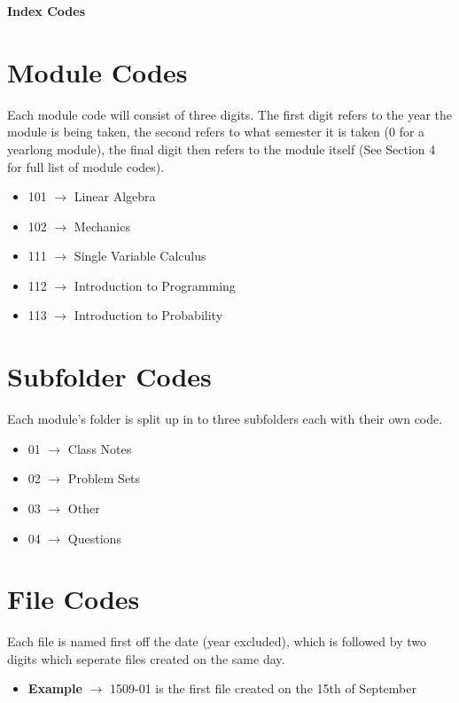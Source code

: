 \documentclass{article}
\begin{document}
\begin{center}
    \Huge \textbf{Index Codes}
\end{center}
\vspace{5mm}
\section{\textbf{Module Codes}}
Each module code will consist of three digits. The first digit refers to the year the module is being taken, 
the second refers to what semester it is taken (0 for a yearlong module), the final digit then refers to 
the module itself (See Section 4 for full list of module codes).
\begin{itemize}
    \item 101 $\longrightarrow$ Linear Algebra
    \item 102 $\longrightarrow$ Mechanics
    \item 111 $\longrightarrow$ Single Variable Calculus
    \item 112 $\longrightarrow$ Introduction to Programming
    \item 113 $\longrightarrow$ Introduction to Probability
\end{itemize}
\vspace{2.5mm}
\section{\textbf{Subfolder Codes}}
Each module's folder is split up in to three subfolders each with their own code. 
\begin{itemize}
    \item 01 $\longrightarrow$ Class Notes
    \item 02 $\longrightarrow$ Problem Sets
    \item 03 $\longrightarrow$ Other
    \item 04 $\longrightarrow$ Questions
\end{itemize}
\vspace{2.5mm}
\section{\textbf{File Codes}}
Each file is named first off the date (year excluded), which is followed by two digits which seperate files 
created on the same day.
\begin{itemize}
    \item \textbf{Example} $\longrightarrow$ 1509-01 is the first file created on the 15th of September
\end{itemize}
\vspace{2.5mm}
\end{document}
